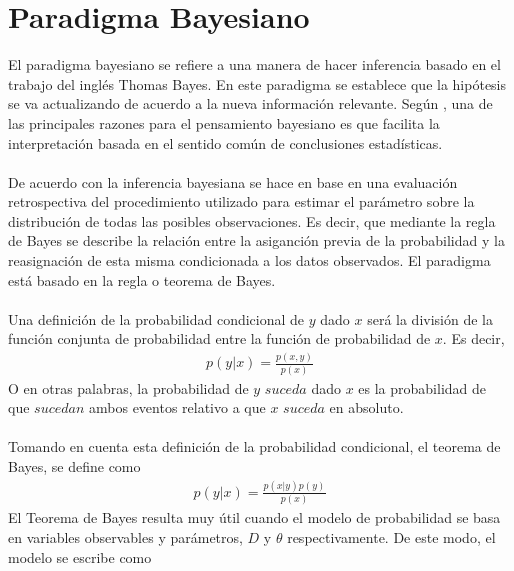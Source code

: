 \section{Paradigma Bayesiano}
El paradigma bayesiano se refiere a una manera de hacer inferencia basado en el trabajo del ingl\'es Thomas Bayes. En este paradigma se establece que la hip\'otesis se va actualizando de acuerdo a la nueva informaci\'on  relevante. Seg\'un \cite{gelman2014bayesian}, una de las principales razones para el pensamiento bayesiano es que facilita la interpretaci\'on basada en el sentido com\'un de conclusiones estad\'isticas. \\
\\
De acuerdo con \cite{gelman2014bayesian} la inferencia bayesiana se hace en base en una evaluaci\'on retrospectiva del procedimiento utilizado para estimar el par\'ametro sobre la distribuci\'on de todas las posibles observaciones. Es decir, que mediante la regla de Bayes se describe la relaci\'on entre la asiganci\'on previa de la probabilidad y la reasignaci\'on de esta misma condicionada a los datos observados. El paradigma est\'a basado en la regla o teorema de Bayes.\\
\\
Una definici\'on de la probabilidad condicional de $y$ dado $x$  ser\'a la divisi\'on de la funci\'on conjunta de probabilidad entre la funci\'on de probabilidad de $x$. Es decir,
\begin{align*}
p(y|x)=\frac{p(x,y)}{p(x)}
\end{align*}
O en otras palabras, la probabilidad de $y$ $suceda$ dado $x$ es la probabilidad de que $sucedan$ ambos eventos relativo a que $x$ $suceda$ en absoluto.\\
\\
Tomando en cuenta esta definici\'on de la probabilidad condicional, el teorema de Bayes, se define como
\begin{align*}
p(y|x)=\frac{p(x|y)p(y)}{p(x)}
\end{align*}
El Teorema de Bayes resulta muy \'util cuando el modelo de probabilidad se basa en variables observables y  par\'ametros, $D$ y $\theta$ respectivamente. De este modo, el modelo se escribe como
